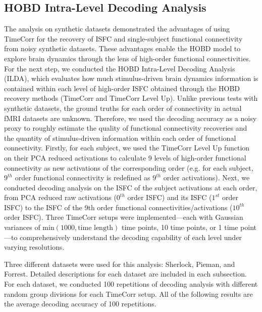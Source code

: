 \documentclass[11pt]{article}
\begin{document}
\subsection{HOBD Intra-Level Decoding Analysis}
The analysis on synthetic datasets demonstrated the advantages of using TimeCorr for the recovery of ISFC and single-subject functional connectivity from noisy synthetic datasets. These advantages enable the HOBD model to explore brain dynamics through the lens of high-order functional connectivities. For the next step, we conducted the HOBD Intra-Level Decoding Analysis (ILDA), which evaluates how much stimulus-driven brain dynamics information is contained within each level of high-order ISFC obtained through the HOBD recovery methods (TimeCorr and TimeCorr Level Up). Unlike previous tests with synthetic datasets, the ground truths for each order of connectivity in actual fMRI datasets are unknown. Therefore, we used the decoding accuracy as a noisy proxy to roughly estimate the quality of functional connectivity recoveries and the quantity of stimulus-driven information within each order of functional connectivity. Firstly, for each subject, we used the TimeCorr Level Up function on their PCA reduced activations to calculate 9 levels of high-order functional connectivity as new activations of the corresponding order (e.g. for each subject, $9^{th}$ order functional connectivity is redefined as $9^{th}$ order activations). Next, we conducted decoding analysis on the ISFC of the subject activations at each order, from PCA reduced raw activations ($0^{th}$ order ISFC) and its ISFC ($1^{st}$ order ISFC) to the ISFC of the 9th order functional connectivities/activations ($10^{th}$ order ISFC). Three TimeCorr setups were implemented---each with Gaussian variances of $\text{min}(1000,\text{time length})$ time points, 10 time points, or 1 time point---to comprehensively understand the decoding capability of each level under varying resolutions.

Three different datasets were used for this analysis: Sherlock, Pieman, and Forrest. Detailed descriptions for each dataset are included in each subsection. For each dataset, we conducted 100 repetitions of decoding analysis with different random group divisions for each TimeCorr setup. All of the following results are the average decoding accuracy of 100 repetitions.
\end{document}
